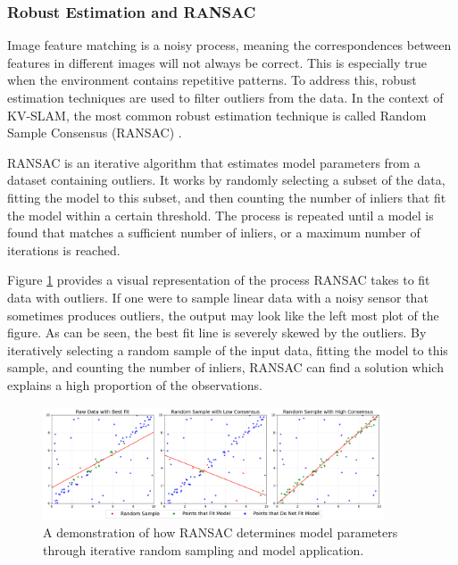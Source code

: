 \subsubsection{Robust Estimation and RANSAC}

Image feature matching is a noisy process, meaning the correspondences between features in different images will not always be correct. This is especially true when the environment contains repetitive patterns. To address this, robust estimation techniques are used to filter outliers from the data. In the context of KV-SLAM, the most common robust estimation technique is called Random Sample Consensus (RANSAC) \cite{fischlerRandomSampleConsensus1981}.

RANSAC is an iterative algorithm that estimates model parameters from a dataset containing outliers. It works by randomly selecting a subset of the data, fitting the model to this subset, and then counting the number of inliers that fit the model within a certain threshold. The process is repeated until a model is found that matches a sufficient number of inliers, or a maximum number of iterations is reached.

Figure \ref{fig:ransac} provides a visual representation of the process RANSAC takes to fit data with outliers. If one were to sample linear data with a noisy sensor that sometimes produces outliers, the output may look like the left most plot of the figure. As can be seen, the best fit line is severely skewed by the outliers. By iteratively selecting a random sample of the input data, fitting the model to this sample, and counting the number of inliers, RANSAC can find a solution which explains a high proportion of the observations.

\begin{figure}[!ht]
    \centering
    \includegraphics[width=0.9\textwidth]{resources/ransac.png}
    \caption[2D RANSAC Example]{A demonstration of how RANSAC determines model parameters through iterative random sampling and model application.}
    \label{fig:ransac}
\end{figure}

